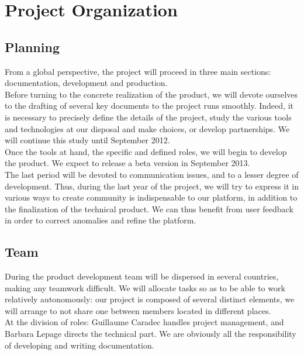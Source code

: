 \documentclass{life-fr}
\begin{document}
\chapter{Project Organization}

\section{Planning}

From a global perspective, the project will proceed in three main sections: documentation, development and production.\\

Before turning to the concrete realization of the product, we will devote ourselves to the drafting of several key documents to the project runs smoothly. Indeed, it is necessary to precisely define the details of the project, study the various tools and technologies at our disposal and make choices, or develop partnerships. We will continue this study until September 2012.\\

Once the tools at hand, the specific and defined roles, we will begin to develop the product. We expect to release a beta version in September 2013.\\

The last period will be devoted to communication issues, and to a lesser degree of development. Thus, during the last year of the project, we will try to express it in various ways to create community is indispensable to our platform, in addition to the finalization of the technical product. We can thus benefit from user feedback in order to correct anomalies and refine the platform.

\section{Team}

During the product development team will be dispersed in several countries, making any teamwork difficult. We will allocate tasks so as to be able to work relatively autonomously: our project is composed of several distinct elements, we will arrange to not share one between members located in different places.\\

At the division of roles: Guillaume Caradec handles project management, and Barbara Lepage directs the technical part. We are obviously all the responsibility of developing and writing documentation.\\
\end{document}
